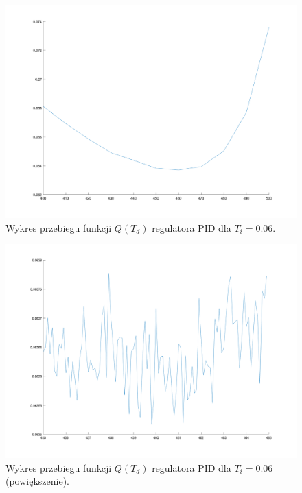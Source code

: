 \documentclass[a4paper,10pt]{article}
\begin{document}
\begin{figure}[!h]
    \centering
	\includegraphics[width=130mm]{PID-opt-ti-06.png}
	\caption{Wykres przebiegu funkcji $Q(T_{d})$ regulatora PID dla $T_{i}=0.06$.}
    \label{fig:regulatorPIDti35opt1}
\end{figure}
\begin{figure}[!h]
    \centering
	\includegraphics[width=130mm]{PID-opt-ti-06-zoom.png}
	\caption{Wykres przebiegu funkcji $Q(T_{d})$ regulatora PID dla $T_{i}=0.06$ (powiększenie).}
    \label{fig:regulatorPIDti35opt2}
\end{figure}
\newpage
\end{document}
